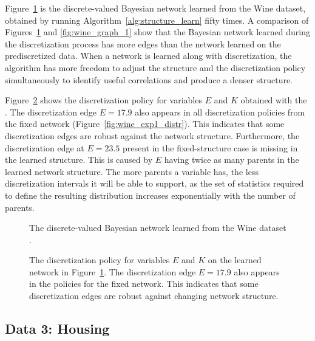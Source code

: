 Figure~\ref{fig:wine_graph_2} is the discrete-valued Bayesian network learned from the Wine dataset, obtained by running Algorithm~\ref{alg:structure_learn} fifty times.
A comparison of Figures~\ref{fig:wine_graph_2} and \ref{fig:wine_graph_1} show that the Bayesian network learned during the discretization process has more edges than the network learned on the prediscretized data.
When a network is learned along with discretization, the algorithm has more freedom to adjust the structure and the discretization policy simultaneously to identify useful correlations and produce a denser structure.

Figure~\ref{fig:wine_exp2_distr} shows the discretization policy for variables $E$ and $K$ obtained with the .
The discretization edge $E = 17.9$ also appears in all discretization policies from the fixed network (Figure~\ref{fig:wine_exp1_distr}).
This indicates that some discretization edges are robust against the network structure.
Furthermore, the discretization edge at $E = 23.5$ present in the fixed-structure case is missing in the learned structure.
This is caused by $E$ having twice as many parents in the learned network structure.
The more parents a variable has, the less discretization intervals it will be able to support, as the set of statistics required to define the resulting distribution increases exponentially with the number of parents.

\begin{figure}[ht]
  \centering
  \scalebox{0.7}{}
  \caption{The discrete-valued Bayesian network learned from the Wine dataset .}
  \label{fig:wine_graph_2}
\end{figure}

\begin{figure}[ht]
  \centering
  
  \caption{
    The discretization policy for variables $E$ and $K$ on the learned network in Figure~\ref{fig:wine_graph_2}.
    The discretization edge $E = 17.9$ also appears in the policies for the fixed network.
    This indicates that some discretization edges are robust against changing network structure.
  }
  \label{fig:wine_exp2_distr}
\end{figure}

%
%

\subsection{Data 3: Housing}
\label{subsec:housing}


